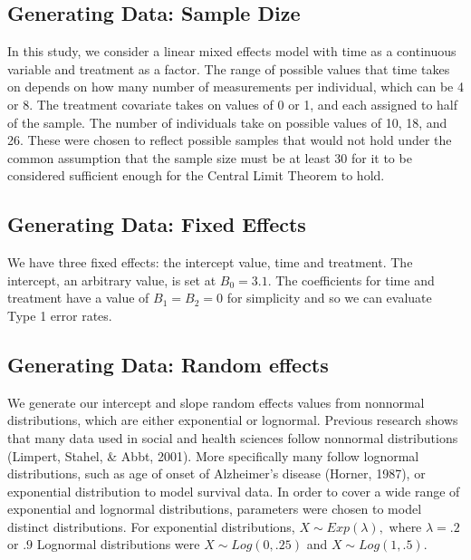 \documentclass[12pt, twoside]{amherstthesis}
\begin{document}
\hypertarget{generating-data-sample-dize}{%
\subsection{Generating Data: Sample Dize}\label{generating-data-sample-dize}}

In this study, we consider a linear mixed effects model with time as a continuous variable and treatment as a factor. The range of possible values that time takes on depends on how many number of measurements per individual, which can be 4 or 8. The treatment covariate takes on values of 0 or 1, and each assigned to half of the sample. The number of individuals take on possible values of 10, 18, and 26. These were chosen to reflect possible samples that would not hold under the common assumption that the sample size must be at least 30 for it to be considered sufficient enough for the Central Limit Theorem to hold.

\hypertarget{generating-data-fixed-effects}{%
\subsection{Generating Data: Fixed Effects}\label{generating-data-fixed-effects}}

We have three fixed effects: the intercept value, time and treatment. The intercept, an arbitrary value, is set at \(B_0 = 3.1\). The coefficients for time and treatment have a value of \(B_1 = B_2 = 0\) for simplicity and so we can evaluate Type 1 error rates.

\hypertarget{generating-data-random-effects}{%
\subsection{Generating Data: Random effects}\label{generating-data-random-effects}}

We generate our intercept and slope random effects values from nonnormal distributions, which are either exponential or lognormal. Previous research shows that many data used in social and health sciences follow nonnormal distributions (Limpert, Stahel, \& Abbt, 2001). More specifically many follow lognormal distributions, such as age of onset of Alzheimer's disease (Horner, 1987), or exponential distribution to model survival data. In order to cover a wide range of exponential and lognormal distributions, parameters were chosen to model distinct distributions. For exponential distributions, \(X\sim\mathit{Exp}(\lambda),\) where \(\lambda = .2\) or \(.9\) Lognormal distributions were \(X\sim\mathit{Log}(0,.25)\) and \(X\sim\mathit{Log}(1,.5).\)
\end{document}
